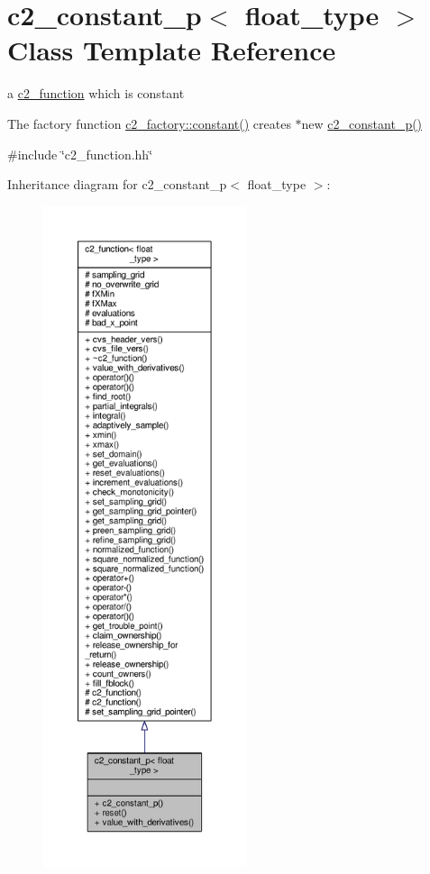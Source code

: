 \hypertarget{classc2__constant__p}{}\section{c2\+\_\+constant\+\_\+p$<$ float\+\_\+type $>$ Class Template Reference}
\label{classc2__constant__p}


a \hyperlink{classc2__function}{c2\+\_\+function} which is constant

The factory function \hyperlink{classc2__factory_a98e385b2b927d15d4376821302061d4d}{c2\+\_\+factory\+::constant()} creates $\ast$new \hyperlink{classc2__constant__p_ae62311ccce870ca4fb79b7c9d525a3d2}{c2\+\_\+constant\+\_\+p()}  




{\ttfamily \#include \char`\"{}c2\+\_\+function.\+hh\char`\"{}}



Inheritance diagram for c2\+\_\+constant\+\_\+p$<$ float\+\_\+type $>$\+:
\nopagebreak
\begin{figure}[H]
\begin{center}
\leavevmode
\includegraphics[height=550pt]{classc2__constant__p__inherit__graph}
\end{center}
\end{figure}


